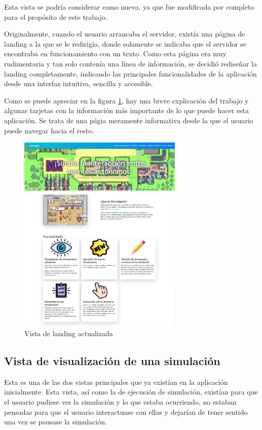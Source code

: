 Esta vista se podría considerar como nueva, ya que fue modificada por completo para el propósito de este trabajo.

Originalmente, cuando el usuario arrancaba el servidor, existía una página de landing a la que se le redirigía, donde solamente se indicaba que el servidor se encontraba en funcionamiento con un texto. Como esta página era muy rudimentaria y tan solo contenía una línea de información, se decidió rediseñar la landing completamente, indicando las principales funcionalidades de la aplicación desde una interfaz intuitiva, sencilla y accesible.

Como se puede apreciar en la figura \ref{fig:landing}, hay una breve explicación del trabajo y algunas tarjetas con la información más importante de lo que puede hacer esta aplicación. Se trata de una págia meramente informativa desde la que el usuario puede navegar hacia el resto.

\begin{figure}[H]
	\centering
	\includegraphics[width = 0.7\textwidth]{Imagenes/Vectorial/landing.png}
	\caption{Vista de landing actualizada}
	\label{fig:landing}
\end{figure}

\subsection{Vista de visualización de una simulación}
\label{sec:vistaSimulacion}

Esta es una de las dos vistas principales que ya existían en la aplicación inicialmente. Esta vista, así como la de ejecución de simulación, existían para que el usuario pudiese ver la simulación y lo que estaba ocurriendo, no estaban pensadas para que el usuario interactuase con ellas y dejarían de tener sentido una vez se pausase la simulación.

